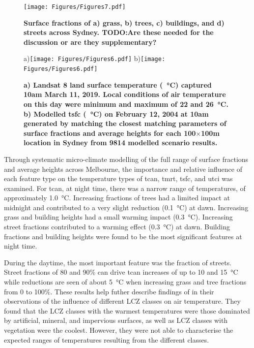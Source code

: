 \documentclass[final,3p,times,authoryear]{elsarticle}
\begin{document}
\begin{figure}
\centering
\texttt{[image: Figures/Figures7.pdf]}
\caption{\bf Surface fractions of a) grass, b) trees, c) buildings, and d) streets across Sydney. TODO:Are these needed for the discussion or are they supplementary?}
 \label{fig:sydfracs}
\end{figure}

\begin{figure} 
\centering
a)\texttt{[image: Figures/Figures6.pdf]}
b)\texttt{[image: Figures/Figures6.pdf]}
\caption{\bf a) Landsat 8 land surface temperature (\SI{}{\degreeCelsius}) captured 10am March 11, 2019. Local conditions of air temperature on this day were minimum and maximum of 22 and 26\SI{}{\degreeCelsius}. b) Modelled \gls{tsfc} (\SI{}{\degreeCelsius}) on February 12, 2004 at 10am generated by matching the closest matching parameters of surface fractions and average heights for each 100$\times$100m location in Sydney from 9814 modelled scenario results.}
 \label{fig:Sydney-Landsat-LST-11-03-2019}
 \label{fig:Sydney_TSFC12_85}
\end{figure}

Through systematic micro-climate modelling of the full range of surface fractions and average heights across Melbourne, the importance and relative influence of each feature type on the temperature types of \gls{tcan}, \gls{tmrt}, \gls{tsfc}, and \gls{utci} was examined. For \gls{tcan}, at night time, there was a narrow range of temperatures, of approximately 1.0\SI{}{\degreeCelsius}. Increasing fractions of trees had a limited impact at midnight and contributed to a very slight reduction (0.1\SI{}{\degreeCelsius}) at dawn. Increasing grass and building heights had a small warming impact (0.3\SI{}{\degreeCelsius}). Increasing street fractions contributed to a warming effect (0.3\SI{}{\degreeCelsius}) at dawn. Building fractions and building heights were found to be the most significant features at night time.

During the daytime, the most important feature was the fraction of streets. Street fractions of 80 and 90\% can drive \gls{tcan} increases of up to 10 and 15\SI{}{\degreeCelsius} while reductions are seen of about 5\SI{}{\degreeCelsius} when increasing grass and tree fractions from 0 to 100\%. These results help futher describe findings of \cite{Emery2021} in their observations of the influence of different LCZ classes on air temperature. They found that the LCZ classes with the warmest temperatures were those dominated by artificial, mineral, and impervious surfaces, as well as LCZ classes with vegetation were the coolest. However, they were not able to characterise the expected ranges of temperatures resulting from the different classes.
\end{document}
